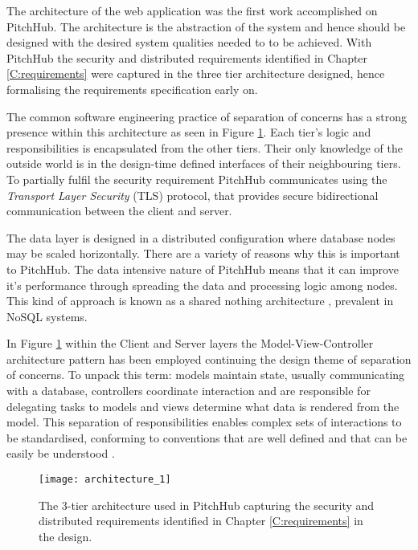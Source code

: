 The architecture of the web application was the first work accomplished on PitchHub. The architecture is the abstraction of the system and hence should be designed with the desired system qualities needed to to be achieved. With PitchHub the security and distributed requirements identified in Chapter \ref{C:requirements} were captured in the three tier architecture designed, hence formalising the requirements specification early on.
\par
The common software engineering practice of separation of concerns has a strong presence within this architecture as seen in Figure \ref{fig:architecture_1}. Each tier's logic and responsibilities is encapsulated from the other tiers. Their only knowledge of the outside world is in the design-time defined interfaces of their neighbouring tiers. To partially fulfil the security requirement PitchHub communicates using the \textit{Transport Layer Security} (TLS) protocol, that provides secure bidirectional communication between the client and server.
\par
The data layer is designed in a distributed configuration where database nodes may be scaled horizontally. There are a variety of reasons why this is important to PitchHub. The data intensive nature of PitchHub means that it can improve it's performance through spreading the data and processing logic among nodes. This kind of approach is known as a shared nothing architecture \cite{stonebraker1986case}, prevalent in NoSQL systems.
\par
In Figure \ref{fig:architecture_1} within the Client and Server layers the Model-View-Controller architecture pattern has been employed continuing the design theme of separation of concerns. To unpack this term: models maintain state, usually communicating with a database, controllers coordinate interaction and are responsible for delegating tasks to models and views determine what data is rendered from the model. This separation of responsibilities enables complex sets of interactions to be standardised, conforming to conventions that are well defined and that can be easily be understood \cite{leff2001web}.

\begin{figure}[ht]
    \centering
    \texttt{[image: architecture\_1]}
    \caption{The 3-tier architecture used in PitchHub capturing the security and distributed requirements identified in Chapter \ref{C:requirements} in the design.}
    \label{fig:architecture_1}
\end{figure}

